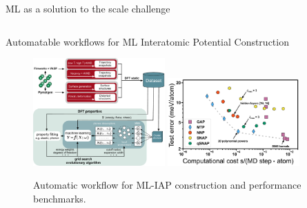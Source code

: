 \documentclass[aspectratio=169]{beamer}
\begin{document}
\begin{frame}{ML as a solution to the scale challenge}
\begin{columns}
\begin{itemize}
            \end{itemize}
        \end{columns}

    \end{frame}


    \begin{frame}{Automatable workflows for ML Interatomic Potential Construction}
        \begin{figure}
            \centering
            \includegraphics[width=0.45\textwidth]{figures/mliapworkflow.pdf}
            \includegraphics[width=0.45\textwidth]{figures/mliapcostvsperformance.pdf}
            \caption{Automatic workflow for ML-IAP construction and performance benchmarks.\cite{zuoPerformanceCostAssessment2020}}
        \end{figure}
    \end{frame}
\end{document}
